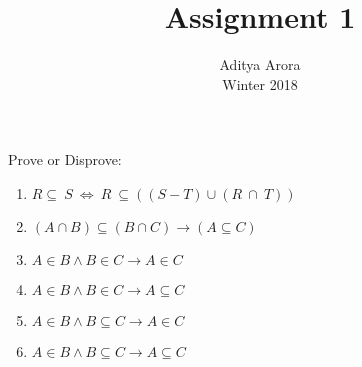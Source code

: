 \documentclass[12pt]{article}
\newenvironment{problem}[2][Problem]{\begin{trivlist}
\item[\hskip \labelsep {\bfseries #1}\hskip \labelsep {\bfseries #2.}]}{\end{trivlist}}
\begin{document}
 
 
\title{Assignment 1}%
\author{Aditya Arora\\ %
Winter 2018} %
 
\maketitle
\begin{problem}{1}
Prove or Disprove:
\begin{enumerate}[label=\alph*)]
    \item $ R \subseteq \ S\ \Leftrightarrow \ R \ \subseteq ((S-T)\cup(R\ \cap\ T)) $
    \item $(A \cap B) \subseteq (B \cap C) \longrightarrow (A \subseteq C)$ 
    \item $A \in B \wedge B \in C \longrightarrow A \in C$
    \item $A \in B \wedge B \in C \longrightarrow A \subseteq C$
    \item $A \in B \wedge B \subseteq C \longrightarrow A \in C$
    \item $A \in B \wedge B \subseteq C \longrightarrow A \subseteq C$
\end{enumerate}
\end{problem}
\end{document}
